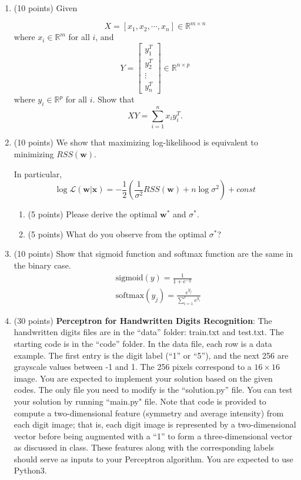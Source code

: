 \documentclass[11pt]{article}
\begin{document}
\begin{enumerate}
\begin{enumerate}
\end{enumerate}

\item (10 points) Given

$$X=[x_1,x_2,\cdots,x_n]\in\mathbb{R}^{m\times n}$$
where
$x_i\in\mathbb{R}^m$ for all $i$, and
$$Y=\begin{bmatrix}
    y_1^T       \\
    y_2^T       \\
    \vdots\\
    y_n^T
\end{bmatrix}\in\mathbb{R}^{n\times p}$$
where $y_i\in\mathbb{R}^p$ for all $i$. Show that $$XY=\sum_{i=1}^n
x_i y_i^T.$$

\item (10 points) We show that maximizing log-likelihood is
equivalent to minimizing $RSS(\boldsymbol w)$.

In particular,
$$\log\mathcal{L}(\boldsymbol{w} | \boldsymbol{x}) 
= -\frac{1}{2}\left( \frac{1}{\sigma^2}RSS(\boldsymbol{w}) + n \log \sigma^2 \right) + const$$
\begin{enumerate}
    \item (5 points) Please derive the optimal $\boldsymbol w^*$ and $\sigma^*$.
    \item (5 points) What do you observe from the optimal $\sigma^*$?
\end{enumerate}

\item (10 points) Show that sigmoid function and
softmax function are the same in the binary case.
\begin{align*}
    &\mbox{sigmoid}(y) = \frac{1}{1 + e^{-y}}\\
    &\mbox{softmax}(y_j) = \frac{e^{y_j}}{\sum_{i=1}^c e^{y_i}} 
\end{align*}

\item (30 points) \textbf{Perceptron for Handwritten Digits Recognition}:
The handwritten digits files are in the ``data'' folder: train.txt
and test.txt. The starting code is in the ``code'' folder. In the
data file, each row is a data example. The first entry is the digit
label (``1'' or ``5''), and the next 256 are grayscale values
between -1 and 1. The 256 pixels correspond to a $16\times16$ image.
You are expected to implement your solution based on the given
codes. The only file you need to modify is the ``solution.py'' file.
You can test your solution by running ``main.py" file. Note that
code is provided to compute a two-dimensional feature (symmetry and
average intensity) from each digit image; that is, each digit image
is represented by a two-dimensional vector before being augmented
with a ``1'' to form a three-dimensional vector as discussed in
class. These features along with the corresponding labels should
serve as inputs to your Perceptron algorithm.
{\color{red}You are expected to use Python3.}


\end{enumerate}
\end{document}
